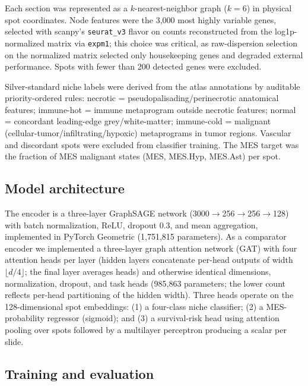 \documentclass[11pt,letterpaper]{article}
\begin{document}
Each section was represented as a $k$-nearest-neighbor graph ($k=6$) in physical spot coordinates. Node features were the 3{,}000 most highly variable genes, selected with scanpy's \texttt{seurat\_v3} flavor \cite{wolf2018} on counts reconstructed from the log1p-normalized matrix via \texttt{expm1}; this choice was critical, as raw-dispersion selection on the normalized matrix selected only housekeeping genes and degraded external performance. Spots with fewer than 200 detected genes were excluded.

Silver-standard niche labels were derived from the atlas annotations by auditable priority-ordered rules: necrotic = pseudopalisading/perinecrotic anatomical features; immune-hot = immune metaprogram outside necrotic features; normal = concordant leading-edge grey/white-matter; immune-cold = malignant (cellular-tumor/infiltrating/hypoxic) metaprograms in tumor regions. Vascular and discordant spots were excluded from classifier training. The MES target was the fraction of MES malignant states (MES, MES.Hyp, MES.Ast) per spot.

\subsection{Model architecture}

The encoder is a three-layer GraphSAGE network \cite{hamilton2017} (3000$\rightarrow$256$\rightarrow$256$\rightarrow$128) with batch normalization, ReLU, dropout 0.3, and mean aggregation, implemented in PyTorch Geometric \cite{fey2019} (1{,}751{,}815 parameters). As a comparator encoder we implemented a three-layer graph attention network (GAT) \cite{velickovic2018} with four attention heads per layer (hidden layers concatenate per-head outputs of width $\lfloor d/4 \rfloor$; the final layer averages heads) and otherwise identical dimensions, normalization, dropout, and task heads (985{,}863 parameters; the lower count reflects per-head partitioning of the hidden width). Three heads operate on the 128-dimensional spot embeddings: (1) a four-class niche classifier; (2) a MES-probability regressor (sigmoid); and (3) a survival-risk head using attention pooling over spots followed by a multilayer perceptron producing a scalar per slide.

\subsection{Training and evaluation}
\end{document}
